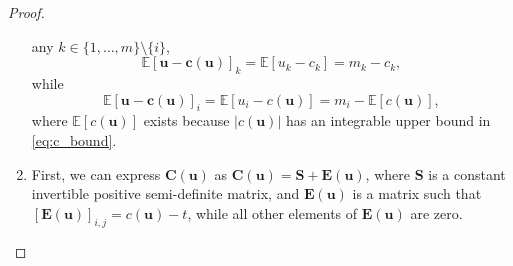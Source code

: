 \documentclass{article}
\theoremstyle{definition}
\begin{document}
\begin{proof}
\begin{enumerate}
    any $k \in \{ 1, \dots, m \} \setminus \{ i \}$,
    \[
      \mathbb{E}[\mathbf{u} - \mathbf{c}(\mathbf{u})]_k = \mathbb{E}[u_k - c_k]
      = m_k - c_k,
    \]
    while
    \[
      \mathbb{E}[\mathbf{u} - \mathbf{c}(\mathbf{u})]_i = \mathbb{E}[u_i
      - c(\mathbf{u})] = m_i - \mathbb{E}[c(\mathbf{u})],
    \]
    where $\mathbb{E}[c(\mathbf{u})]$ exists because $|c(\mathbf{u})|$ has an
    integrable upper bound in \eqref{eq:c_bound}. %
  \item First, we can express $\mathbf{C}(\mathbf{u})$ as
    $\mathbf{C}(\mathbf{u}) = \mathbf{S} + \mathbf{E}(\mathbf{u})$, where
    $\mathbf{S}$ is a constant invertible positive semi-definite matrix, and
    $\mathbf{E}(\mathbf{u})$ is a matrix such that
    $[\mathbf{E}(\mathbf{u})]_{i,j} = c(\mathbf{u}) - t$, while all other
    elements of $\mathbf{E}(\mathbf{u})$ are zero.


\end{enumerate}
\end{proof}
\end{document}
